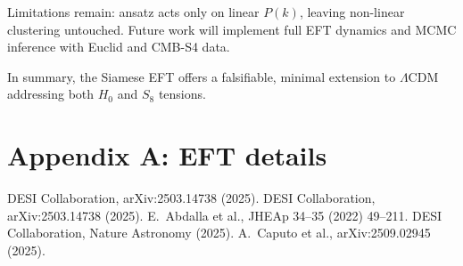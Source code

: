 \documentclass[11pt,a4paper]{article}
\begin{document}
Limitations remain: ansatz acts only on linear $P(k)$, leaving non-linear clustering untouched. Future work will implement full EFT dynamics and MCMC inference with Euclid and CMB-S4 data.

In summary, the Siamese EFT offers a falsifiable, minimal extension to $\Lambda$CDM addressing both $H_0$ and $S_8$ tensions.

\appendix
\section*{Appendix A: EFT details}

\begin{thebibliography}{99}\setlength{\itemsep}{2pt}
 DESI Collaboration, arXiv:2503.14738 (2025).
 DESI Collaboration, arXiv:2503.14738 (2025).
 E.~Abdalla et al., JHEAp 34--35 (2022) 49--211.
 DESI Collaboration, Nature Astronomy (2025).
 A.~Caputo et al., arXiv:2509.02945 (2025).
\end{thebibliography}
\end{document}
